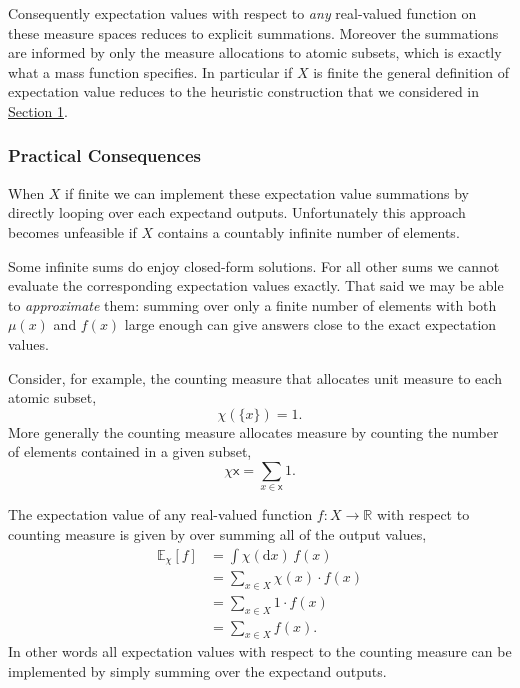 \documentclass[
  letterpaper,
  DIV=11,
  numbers=noendperiod]{scrartcl}
\begin{document}
Consequently expectation values with respect to \emph{any} real-valued
function on these measure spaces reduces to explicit summations.
Moreover the summations are informed by only the measure allocations to
atomic subsets, which is exactly what a mass function specifies. In
particular if \(X\) is finite the general definition of expectation
value reduces to the heuristic construction that we considered in
\href{@finite_expectation}{Section 1}.

\hypertarget{practical-consequences}{%
\subsubsection{Practical Consequences}\label{practical-consequences}}

When \(X\) if finite we can implement these expectation value summations
by directly looping over each expectand outputs. Unfortunately this
approach becomes unfeasible if \(X\) contains a countably infinite
number of elements.

Some infinite sums do enjoy closed-form solutions. For all other sums we
cannot evaluate the corresponding expectation values exactly. That said
we may be able to \emph{approximate} them: summing over only a finite
number of elements with both \(\mu(x)\) and \(f(x)\) large enough can
give answers close to the exact expectation values.

Consider, for example, the counting measure that allocates unit measure
to each atomic subset, \[
\chi( \{x \}) = 1.
\] More generally the counting measure allocates measure by counting the
number of elements contained in a given subset, \[
\chi{ \mathsf{x} } = \sum_{x \in \mathsf{x}} 1.
\]

The expectation value of any real-valued function
\(f: X \rightarrow \mathbb{R}\) with respect to counting measure is
given by over summing all of the output values, \begin{align*}
\mathbb{E}_{\chi}[f]
&=
\int \chi( \mathrm{d} x) \, f(x)
\\
&=
\sum_{x \in X} \chi(x) \cdot f(x)
\\
&=
\sum_{x \in X} 1 \cdot f(x)
\\
&=
\sum_{x \in X} f(x).
\end{align*} In other words all expectation values with respect to the
counting measure can be implemented by simply summing over the expectand
outputs.
\end{document}

